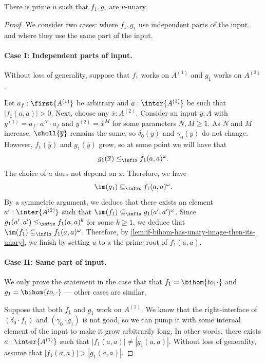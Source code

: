 \begin{claim}\label{claim:first-pair-of-bihoms-is-unary}
    There is prime $u$ such that $f_1,g_1$ are $u$-unary.
\end{claim}

\begin{proof}
    We consider two cases: where $f_1, g_1$ use independent parts of the input, and where they use the same part of the input.
    
    \paragraph{Case I: Independent parts of input.} Without loss of generality, suppose that $f_1$ works on $A^{(1)}$ and $g_1$ works on $A^{(2)}$. 

    Let $a_f : \first{A^{(1)}}$ be arbitrary and $a : \inter{A^{(1)}}$ be such that $|f_1(a,a)| > 0$. Next, choose any $\overline x : A^{(2)}$. Consider an input $\overline y : A$ with $y^{(1)} = a_f \cdot a^N \cdot a_f$ and $y^{(2)} = \overline x^M$ for some parameters $N,M \geq 1$. As $N$ and $M$ increase, $\shell{\overline y}$ remains the same, so $\delta_0(\overline y)$ and $\gamma_0(\overline y)$ do not change. However, $f_1(\overline y)$ and $g_1(\overline y)$ grow, so at some point we will have that
    \[
        g_1(\overline x) \leq_\infix f_1(a,a)^\omega.
    \]
    The choice of $a$ does not depend on $\overline x$. Therefore, we have
    \[
        \im(g_1) \subseteq_\infix f_1(a,a)^\omega.
    \]
    By a symmetric argument, we deduce that there exists an element $a' : \inter{A^{(2)}}$ such that $\im(f_1) \subseteq_\infix g_1(a',a')^\omega$. Since $g_1(a',a') \leq_\infix f_1(a,a)^k$ for some $k \geq 1$, we deduce that $\im(f_1) \subseteq_\infix f_1(a,a)^\omega$. Therefore, by \cref{lem:if-bihom-has-unary-image-then-its-unary}, we finish by setting $u$ to a the prime root of $f_1(a,a)$.
    
    \paragraph{Case II: Same part of input.} 

    We only prove the statement in the case that that $f_1 = \bihom{to, \cdot}$ and $g_1 = \bihom{to, \cdot}$ --- other cases are similar. 
    
    Suppose that both $f_1$ and $g_1$ work on $A^{(1)}$. We know that the right-interface of $(\delta_0 \cdot f_1)$ and $(\gamma_0 \cdot g_1)$ is not good, so we can pump it with some internal element of the input to make it grow arbitrarily long. In other words, there exists $a : \inter{A^{(1)}}$ such that $|f_1(a,a)| \neq |g_1(a,a)|$. Without loss of generality, assume that $|f_1(a,a)| > |g_1(a,a)|$.
    

\end{proof}
